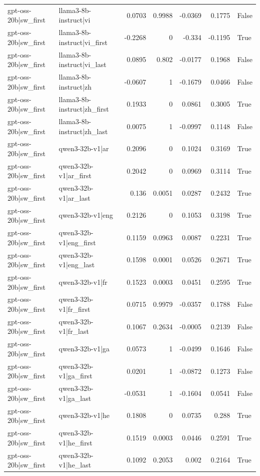 \begin{table}
\begin{tabular}{l l r r r r l}
gpt-oss-20b|sw_first & llama3-8b-instruct|vi & 0.0703 & 0.9988 & -0.0369 & 0.1775 & False \\
gpt-oss-20b|sw_first & llama3-8b-instruct|vi_first & -0.2268 & 0 & -0.334 & -0.1195 & True \\
gpt-oss-20b|sw_first & llama3-8b-instruct|vi_last & 0.0895 & 0.802 & -0.0177 & 0.1968 & False \\
gpt-oss-20b|sw_first & llama3-8b-instruct|zh & -0.0607 & 1 & -0.1679 & 0.0466 & False \\
gpt-oss-20b|sw_first & llama3-8b-instruct|zh_first & 0.1933 & 0 & 0.0861 & 0.3005 & True \\
gpt-oss-20b|sw_first & llama3-8b-instruct|zh_last & 0.0075 & 1 & -0.0997 & 0.1148 & False \\
gpt-oss-20b|sw_first & qwen3-32b-v1|ar & 0.2096 & 0 & 0.1024 & 0.3169 & True \\
gpt-oss-20b|sw_first & qwen3-32b-v1|ar_first & 0.2042 & 0 & 0.0969 & 0.3114 & True \\
gpt-oss-20b|sw_first & qwen3-32b-v1|ar_last & 0.136 & 0.0051 & 0.0287 & 0.2432 & True \\
gpt-oss-20b|sw_first & qwen3-32b-v1|eng & 0.2126 & 0 & 0.1053 & 0.3198 & True \\
gpt-oss-20b|sw_first & qwen3-32b-v1|eng_first & 0.1159 & 0.0963 & 0.0087 & 0.2231 & True \\
gpt-oss-20b|sw_first & qwen3-32b-v1|eng_last & 0.1598 & 0.0001 & 0.0526 & 0.2671 & True \\
gpt-oss-20b|sw_first & qwen3-32b-v1|fr & 0.1523 & 0.0003 & 0.0451 & 0.2595 & True \\
gpt-oss-20b|sw_first & qwen3-32b-v1|fr_first & 0.0715 & 0.9979 & -0.0357 & 0.1788 & False \\
gpt-oss-20b|sw_first & qwen3-32b-v1|fr_last & 0.1067 & 0.2634 & -0.0005 & 0.2139 & False \\
gpt-oss-20b|sw_first & qwen3-32b-v1|ga & 0.0573 & 1 & -0.0499 & 0.1646 & False \\
gpt-oss-20b|sw_first & qwen3-32b-v1|ga_first & 0.0201 & 1 & -0.0872 & 0.1273 & False \\
gpt-oss-20b|sw_first & qwen3-32b-v1|ga_last & -0.0531 & 1 & -0.1604 & 0.0541 & False \\
gpt-oss-20b|sw_first & qwen3-32b-v1|he & 0.1808 & 0 & 0.0735 & 0.288 & True \\
gpt-oss-20b|sw_first & qwen3-32b-v1|he_first & 0.1519 & 0.0003 & 0.0446 & 0.2591 & True \\
gpt-oss-20b|sw_first & qwen3-32b-v1|he_last & 0.1092 & 0.2053 & 0.002 & 0.2164 & True \\

\end{tabular}
\end{table}
